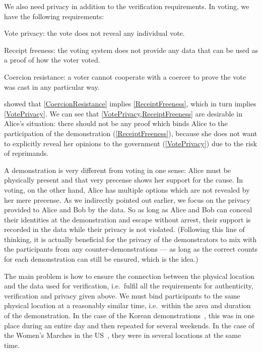 We also need privacy in addition to the verification requirements.
In voting, we have the following requirements:
\begin{requirements}[P]
\item\label{VotePrivacy} Vote privacy: the vote does not reveal any individual 
  vote.
\item\label{ReceiptFreeness} Receipt freeness: the voting system does not 
  provide any data that can be used as a proof of how the voter voted.
\item\label{CoercionResistance} Coercion resistance: a voter cannot cooperate 
  with a coercer to prove the vote was cast in any particular way.
\end{requirements}
\Textcite{VerifyingPrivacyPropertiesOfVotingProtocols} showed that 
\cref{CoercionResistance} implies \cref{ReceiptFreeness}, which in turn implies
\cref{VotePrivacy}.
We can see that \cref{VotePrivacy,ReceiptFreeness} are desirable in Alice's 
situation: there should not be any proof which binds Alice to the participation 
of the demonstration (\cref{ReceiptFreeness}), because she does not want to 
explicitly reveal her opinions to the government (\cref{VotePrivacy}) due to 
the risk of reprimands.

A demonstration is very different from voting in one sense: Alice must be 
physically present and that very precense shows her support for the cause.
In voting, on the other hand, Alice has multiple options which are not revealed
by her mere precense.
As we indirectly pointed out earlier, we focus on the privacy provided to Alice 
and Bob by the data.
So as long as Alice and Bob can conceal their identities at the demonstration 
and escape without arrest, their support is recorded in the data while their 
privacy is not violated.
(Following this line of thinking, it is actually beneficial for the privacy of 
the demonstrators to mix with the participants from any counter-demonstrations 
--- as long as the correct counts for each demonstration can still be ensured, 
which is the idea.)

The main problem is how to ensure the connection between the physical location 
and the data used for verification, i.e.\ fulfil all the requirements for 
authenticity, verification and privacy given above.
We must bind participants to the same physical location at a reasonably similar 
time, i.e.\ within the area and duration of the demonstration.
In the case of the Korean demonstrations~\cite{2016DemonstrationsInSeoul}, this 
was in one place during an entire day and then repeated for several 
weekends.
In the case of the Women's Marches in the US~\cite{2017WomensMarchesInUS}, they
were in several locations at the same time.

